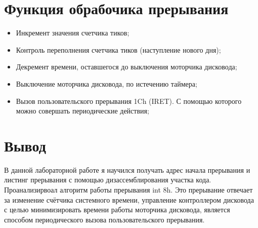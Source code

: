 \documentclass{article}
\begin{document}
\vspace{1em}
\section{Функция обрабочика прерывания}
\vspace{1em}
\begin{itemize}
    \item Инкремент значения счетчика тиков;
    \item Контроль переполнения счетчика тиков (наступление нового дня);
    \item Декремент времени, оставшегося до выключения моторчика дисковода;
    \item Выключение моторчика дисковода, по истечению таймера;
    \item Вызов пользовательского прерывания 1Ch (IRET). С помощью которого можно совершать периодические действия;
\end{itemize}

\section{Вывод}
В данной лабораторной работе я научился получать адрес начала прерывания и листинг прерывания с помощью дизассемблирования участка кода. Проанализирвоал алгоритм работы прерывания int 8h. Это прерывание отвечает за изменение счётчика системного времени, управление контроллером дисковода с целью минимизировать времени работы моторчика дисковода, является способом периодического вызова пользовательского прерывания. 
\end{document}
